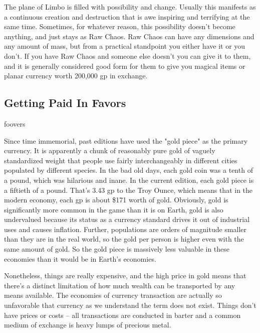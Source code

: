 The plane of Limbo is filled with possibility and change. Usually this manifests as a continuous creation and destruction that is awe inspiring and terrifying at the same time. Sometimes, for whatever reason, this possibility doesn't become anything, and just stays as Raw Chaos. Raw Chaos can have any dimensions and any amount of mass, but from a practical standpoint you either have it or you don't. If you have Raw Chaos and someone else doesn't you can give it to them, and it is generally considered good form for them to give you magical items or planar currency worth 200,000 gp in exchange.

\subsection{Getting Paid In Favors}

foovers


Since time immemorial, past editions have used the "gold piece" as the primary currency. It is apparently a chunk of reasonably pure gold of vaguely standardized weight that people use fairly interchangeably in different cities populated by different species. In the bad old days, each gold coin was a tenth of a pound, which was hilarious and inane. In the current edition, each gold piece is a fiftieth of a pound. That's 3.43 gp to the Troy Ounce, which means that in the modern economy, each gp is about \$171 worth of gold. Obviously, gold is significantly more common in the game than it is on Earth, gold is also undervalued because its status as a currency standard drives it out of industrial uses and causes inflation. Further, populations are orders of magnitude smaller than they are in the real world, so the gold per person is higher even with the same amount of gold. So the gold piece is massively less valuable in these economies than it would be in Earth's economies.

Nonetheless, things are really expensive, and the high price in gold means that there's a distinct limitation of how much wealth can be transported by any means available. The economies of currency transaction are actually so unfavorable that currency as we understand the term does not exist. Things don't have prices or costs -- all transactions are conducted in barter and a common medium of exchange is heavy lumps of precious metal.

